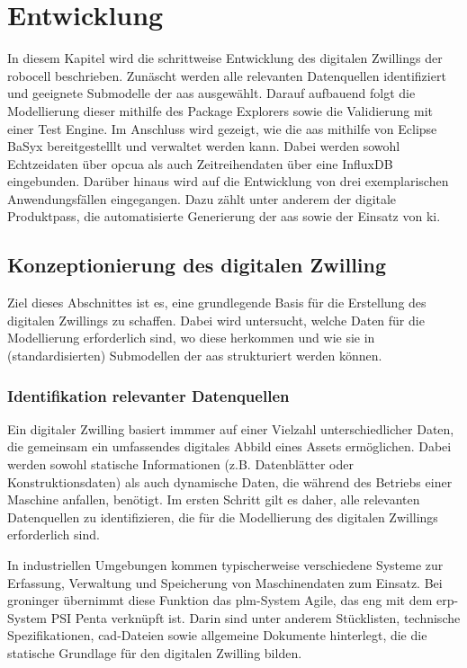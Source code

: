 \newpage
\section{Entwicklung}
In diesem Kapitel wird die schrittweise Entwicklung des digitalen Zwillings der robocell beschrieben.
Zunäscht werden alle relevanten Datenquellen identifiziert und geeignete Submodelle der \acs{aas} ausgewählt.
Darauf aufbauend folgt die Modellierung dieser mithilfe des Package Explorers sowie die Validierung mit einer Test Engine.
Im Anschluss wird gezeigt, wie die \acs{aas} mithilfe von Eclipse BaSyx bereitgestelllt und verwaltet werden kann.
Dabei werden sowohl Echtzeidaten über \acs{opcua} als auch Zeitreihendaten über eine InfluxDB eingebunden.
Darüber hinaus wird auf die Entwicklung von drei exemplarischen Anwendungsfällen eingegangen.
Dazu zählt unter anderem der digitale Produktpass, die automatisierte Generierung der \acs{aas} sowie der Einsatz von \acs{ki}.

\subsection{Konzeptionierung des digitalen Zwilling}
Ziel dieses Abschnittes ist es, eine grundlegende Basis für die Erstellung des digitalen Zwillings zu schaffen.
Dabei wird untersucht, welche Daten für die Modellierung erforderlich sind, wo diese herkommen und wie sie in (standardisierten) Submodellen der \acs{aas} strukturiert werden können.
\subsubsection{Identifikation relevanter Datenquellen}
Ein digitaler Zwilling basiert immmer auf einer Vielzahl unterschiedlicher Daten, die gemeinsam ein umfassendes digitales Abbild eines Assets ermöglichen. 
Dabei werden sowohl statische Informationen (z.B. Datenblätter oder Konstruktionsdaten) als auch dynamische Daten, die während des Betriebs einer Maschine anfallen, benötigt.
Im ersten Schritt gilt es daher, alle relevanten Datenquellen zu identifizieren, die für die Modellierung des digitalen Zwillings erforderlich sind.

In industriellen Umgebungen kommen typischerweise verschiedene Systeme zur Erfassung, Verwaltung und Speicherung von Maschinendaten zum Einsatz.
Bei groninger übernimmt diese Funktion das \acs{plm}-System Agile, das eng mit dem \acs{erp}-System PSI Penta verknüpft ist.
Darin sind unter anderem Stücklisten, technische Spezifikationen, \acs{cad}-Dateien sowie allgemeine Dokumente hinterlegt, die die statische Grundlage  für den digitalen Zwilling bilden.

